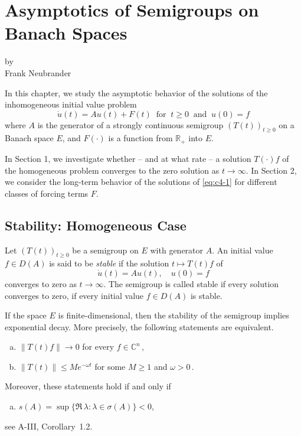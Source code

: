 \chapter{Asymptotics of Semigroups on Banach Spaces}\label{chap:a4}
{\Large
\vspace*{-.75cm}
by \\[.25em]
Frank Neubrander
\vspace{.75cm}
\\
}

In this chapter, we study the asymptotic behavior of the solutions of the inhomogeneous initial value problem
\begin{equation}\label{eq:c4-1}
\dot{u}(t) = Au(t) + F(t) \ \text{ for } \  t \geq 0 \ \text{ and } \  
 u(0) = f \tag{*}
\end{equation}
where $ A $ is the generator of a strongly continuous semigroup $ (T(t))_{t \geq 0} $ on a Banach space $ E $, and $ F(\cdot) $ is a function from $ \mathbb{R}_{+} $ into $ E $.

In Section 1, we investigate whether -- and at what rate -- a solution $ T(\cdot)f $ of the homogeneous problem converges to the zero solution as $ t \to \infty $. 
In Section 2, we consider the long-term behavior of the solutions of \eqref{eq:c4-1} for different classes of forcing terms $ F $.
\section{Stability: Homogeneous Case}\label{sec:c4-1}
Let $ (T(t))_{t \geq 0} $ be a semigroup on $ E $ with generator $ A $.
An initial value $ f \in D(A) $ is said to be \emph{stable} if the solution $ t \mapsto T(t)f $ of
\begin{equation}\label{eq:c4-2}
\dot{u}(t) = Au(t), \quad u(0) = f \tag{ACP}
\end{equation}
converges to zero as $ t \to \infty $. 
The semigroup is called stable if every solution converges to zero, \ie if every initial value $ f \in D(A) $ is stable.

If the space $ E $ is finite-dimensional, then the stability of the semigroup implies exponential decay. 
More precisely, the following statements are equivalent.
\goodbreak
\begin{enumerate}[(a)]
\item 
$ \|T(t)f\| \to 0 $ for every $ f \in \mathbb{C}^{n} $\,,

\item 
$ \|T(t)\| \leq Me^{-\omega t} $ for some $M \geq 1$ and  $\omega > 0 $\,.
\end{enumerate}
Moreover, these statements hold if and only if
\begin{enumerate}[(c)]
\item 
$s(A) = \sup\{\Re\,\lambda \colon \lambda \in \sigma(A)\} < 0$, 
\end{enumerate}
see A-III, Corollary~1.2.

